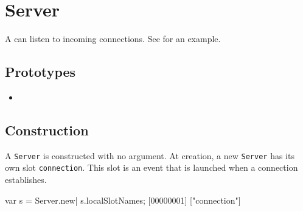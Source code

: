 \section{Server}

A  can listen to incoming connections.  See
 for an example.

\subsection{Prototypes}
\begin{itemize}
\item {}
\end{itemize}

\subsection{Construction}

A \lstinline|Server| is constructed with no argument. At creation, a
new \lstinline|Server| has its own slot \lstinline|connection|. This
slot is an event that is launched when a connection establishes.

\begin{urbiscript}
var s = Server.new|
s.localSlotNames;
[00000001] ["connection"]
\end{urbiscript}

